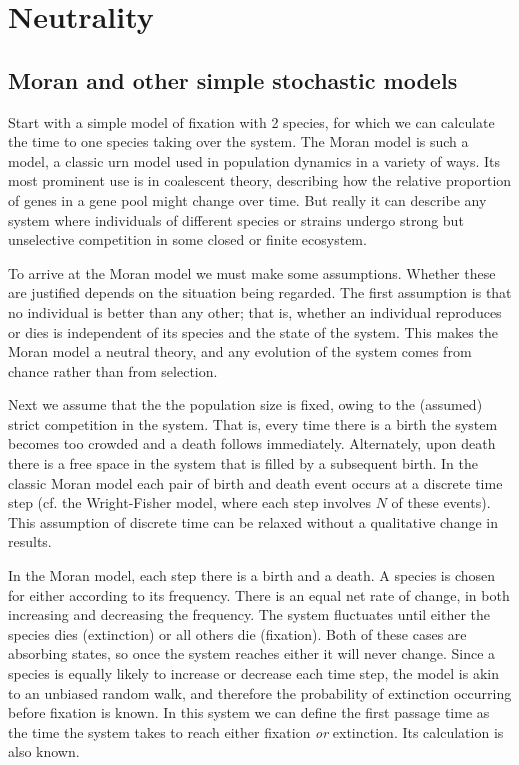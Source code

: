 

\section{Neutrality}
\subsection{Moran and other simple stochastic models}
Start with a simple model of fixation with 2 species, for which we can calculate the time to one species taking over the system. 
The Moran model \cite{Moran1962} is such a model, a classic urn model used in population dynamics in a variety of ways. 
Its most prominent use is in coalescent theory, describing how the relative proportion of genes in a gene pool might change over time. 
But really it can describe any system where individuals of different species or strains undergo strong but unselective competition in some closed or finite ecosystem. 

To arrive at the Moran model we must make some assumptions. 
Whether these are justified depends on the situation being regarded. 
The first assumption is that no individual is better than any other; that is, whether an individual reproduces or dies is independent of its species and the state of the system. 
This makes the Moran model a neutral theory, and any evolution of the system comes from chance rather than from selection. 

Next we assume that the the population size is fixed, owing to the (assumed) strict competition in the system. 
That is, every time there is a birth the system becomes too crowded and a death follows immediately. Alternately, upon death there is a free space in the system that is filled by a subsequent birth. 
In the classic Moran model each pair of birth and death event occurs at a discrete time step (cf. the Wright-Fisher model, where each step involves $N$ of these events). 
This assumption of discrete time can be relaxed without a qualitative change in results. 

In the Moran model, each step there is a birth and a death. 
A species is chosen for either according to its frequency. 
There is an equal net rate of change, in both increasing and decreasing the frequency. 
The system fluctuates until either the species dies (extinction) or all others die (fixation). 
Both of these cases are absorbing states, so once the system reaches either it will never change. 
Since a species is equally likely to increase or decrease each time step, the model is akin to an unbiased random walk, and therefore the probability of extinction occurring before fixation is known. 
In this system we can define the first passage time as the time the system takes to reach either fixation \emph{or} extinction. 
Its calculation is also known. 

